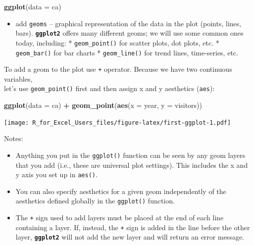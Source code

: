 \documentclass[]{book}
\newenvironment{Shaded}{\begin{snugshade}}{\end{snugshade}}
\newcommand{\DataTypeTok}[1]{\textcolor[rgb]{0.13,0.29,0.53}{#1}}
\newcommand{\KeywordTok}[1]{\textcolor[rgb]{0.13,0.29,0.53}{\textbf{#1}}}
\newcommand{\NormalTok}[1]{#1}
\newcommand{\OperatorTok}[1]{\textcolor[rgb]{0.81,0.36,0.00}{\textbf{#1}}}
\newcommand{\StringTok}[1]{\textcolor[rgb]{0.31,0.60,0.02}{#1}}
\providecommand{\tightlist}{%
  \setlength{\itemsep}{0pt}\setlength{\parskip}{0pt}}
\begin{document}
\begin{Shaded}
\begin{Highlighting}[]
\KeywordTok{ggplot}\NormalTok{(}\DataTypeTok{data =}\NormalTok{ ca)}
\end{Highlighting}
\end{Shaded}

\begin{itemize}
\tightlist
\item
  add \texttt{geoms} -- graphical representation of the data in the plot (points,
  lines, bars). \textbf{\texttt{ggplot2}} offers many different geoms; we will use some
  common ones today, including:
  * \texttt{geom\_point()} for scatter plots, dot plots, etc.
  * \texttt{geom\_bar()} for bar charts
  * \texttt{geom\_line()} for trend lines, time-series, etc.
\end{itemize}

To add a geom to the plot use \texttt{+} operator. Because we have two continuous variables,\\
let's use \texttt{geom\_point()} first and then assign x and y aesthetics (\texttt{aes}):

\begin{Shaded}
\begin{Highlighting}[]
\KeywordTok{ggplot}\NormalTok{(}\DataTypeTok{data =}\NormalTok{ ca) }\OperatorTok{+}\StringTok{ }
\StringTok{  }\KeywordTok{geom_point}\NormalTok{(}\KeywordTok{aes}\NormalTok{(}\DataTypeTok{x =}\NormalTok{ year, }\DataTypeTok{y =}\NormalTok{ visitors))}
\end{Highlighting}
\end{Shaded}

\texttt{[image: R\_for\_Excel\_Users\_files/figure-latex/first-ggplot-1.pdf]}

Notes:

\begin{itemize}
\tightlist
\item
  Anything you put in the \texttt{ggplot()} function can be seen by any geom layers
  that you add (i.e., these are universal plot settings). This includes the x and
  y axis you set up in \texttt{aes()}.
\item
  You can also specify aesthetics for a given geom independently of the
  aesthetics defined globally in the \texttt{ggplot()} function.
\item
  The \texttt{+} sign used to add layers must be placed at the end of each line containing
  a layer. If, instead, the \texttt{+} sign is added in the line before the other layer,
  \textbf{\texttt{ggplot2}} will not add the new layer and will return an error message.
\end{itemize}
\end{document}
